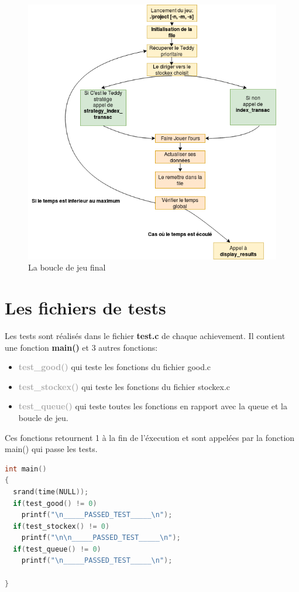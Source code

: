 \documentclass[a4paper,12pt]{article}
\begin{document}
\begin{figure}[!h]
  \centering
  \includegraphics[width=1\textwidth]{BoucleJeuFinal.png}
  \caption{La boucle de jeu final}
  \label{fig:final}
\end{figure}

\section{Les fichiers de tests}

Les tests sont réalisés dans le fichier \textbf{test.c} de chaque achievement. Il contient une fonction \textbf{main()} et 3 autres fonctions:
\begin{itemize}

\item \textcolor{darkgray}{\textbf{test\_good()}} qui teste les fonctions du fichier good.c

\item \textcolor{darkgray}{\textbf{test\_stockex()}} qui teste les fonctions du fichier stockex.c

\item \textcolor{darkgray}{\textbf{test\_queue()}} qui teste toutes les fonctions en rapport avec la queue et la boucle de jeu.

\end{itemize}
Ces fonctions retournent 1 à la fin de l'éxecution et sont appelées par la fonction main() qui passe les tests. 
\begin{lstlisting}[language={C}, frame=single, caption = Les tests des différentes fonctions ]
int main()
{
  srand(time(NULL));
  if(test_good() != 0)
    printf("\n_____PASSED_TEST_____\n");
  if(test_stockex() != 0)
    printf("\n\n_____PASSED_TEST_____\n");
  if(test_queue() != 0)
    printf("\n_____PASSED_TEST_____\n");
 
}
\end{lstlisting}
 
\end{document}
